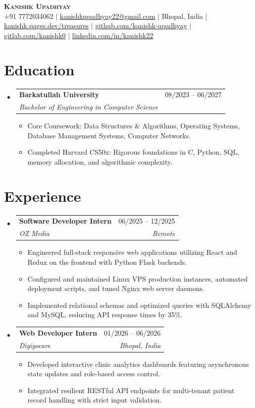 \documentclass[letterpaper,10pt]{article}
\makeatletter
\newcommand{\resumeItem}[1]{\item\small{{#1 \vspace{-2pt}}}}
\newcommand{\resumeSubheading}[4]{
  \vspace{-2pt}\item
    \begin{tabular*}{0.97\textwidth}[t]{l@{\extracolsep{\fill}}r}
      \textbf{#1} & #2 \\
      \textit{\small#3} & \textit{\small #4} \\
    \end{tabular*}\vspace{-7pt}
}
\newcommand{\resumeSubHeadingListStart}{\begin{itemize}[leftmargin=0.15in, label={}]}
\newcommand{\resumeSubHeadingListEnd}{\end{itemize}}
\newcommand{\resumeItemListStart}{\begin{itemize}}
\newcommand{\resumeItemListEnd}{\end{itemize}\vspace{-5pt}}
\makeatother
\begin{document}
\begin{center}
    \textbf{\Huge \scshape Kanishk Upadhyay} \\ \vspace{1pt}
    \small +91 7772034062 $|$ \href{mailto:kanishkupadhyay22@gmail.com}{kanishkupadhyay22@gmail.com} $|$ Bhopal, India $|$ \href{https://kanishk.pages.dev/treasures}{kanishk.pages.dev/treasures} $|$ \href{https://github.com/kanishk-upadhyay}{github.com/kanishk-upadhyay} $|$ \href{https://gitlab.com/kanishk0}{gitlab.com/kanishk0} $|$ \href{https://linkedin.com/in/kanishk22}{linkedin.com/in/kanishk22}
\end{center}

\section{Education}
\resumeSubHeadingListStart
  \resumeSubheading{Barkatullah University}{08/2023 -- 06/2027}{Bachelor of Engineering in Computer Science}{}
  \resumeItemListStart
    \resumeItem{Core Coursework: Data Structures \& Algorithms, Operating Systems, Database Management Systems, Computer Networks.}
    \resumeItem{Completed Harvard CS50x: Rigorous foundations in C, Python, SQL, memory allocation, and algorithmic complexity.}
  \resumeItemListEnd
\resumeSubHeadingListEnd

\section{Experience}
\resumeSubHeadingListStart
  \resumeSubheading{Software Developer Intern}{06/2025 -- 12/2025}{OZ Media}{Remote}
  \resumeItemListStart
    \resumeItem{Engineered full-stack responsive web applications utilizing React and Redux on the frontend with Python Flask backends.}
    \resumeItem{Configured and maintained Linux VPS production instances, automated deployment scripts, and tuned Nginx web server daemons.}
    \resumeItem{Implemented relational schemas and optimized queries with SQLAlchemy and MySQL, reducing API response times by 35\%.}
  \resumeItemListEnd
  \resumeSubheading{Web Developer Intern}{01/2026 -- 06/2026}{Digigocare}{Bhopal, India}
  \resumeItemListStart
    \resumeItem{Developed interactive clinic analytics dashboards featuring asynchronous state updates and role-based access control.}
    \resumeItem{Integrated resilient RESTful API endpoints for multi-tenant patient record handling with strict input validation.}
  \resumeItemListEnd
\resumeSubHeadingListEnd
\end{document}
